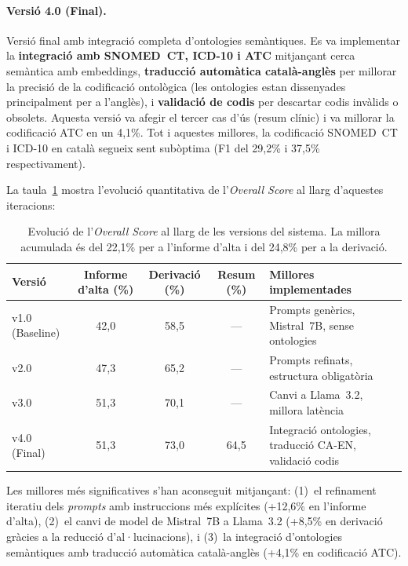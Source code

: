 \documentclass[CAT]{TFUOC}%
\begin{document}
\paragraph{Versió 4.0 (Final).}
Versió final amb integració completa d'ontologies semàntiques. Es va implementar la \textbf{integració amb SNOMED~CT, ICD-10 i ATC} mitjançant cerca semàntica amb embeddings, \textbf{traducció automàtica català-anglès} per millorar la precisió de la codificació ontològica (les ontologies estan dissenyades principalment per a l'anglès), i \textbf{validació de codis} per descartar codis invàlids o obsolets. Aquesta versió va afegir el tercer cas d'ús (resum clínic) i va millorar la codificació ATC en un 4,1\%. Tot i aquestes millores, la codificació SNOMED~CT i ICD-10 en català segueix sent subòptima (F1 del 29,2\% i 37,5\% respectivament).

La taula~\ref{tab:evolution} mostra l'evolució quantitativa de l'\textit{Overall Score} al llarg d'aquestes iteracions:

\begin{table}[H]
\centering
\small
\begin{tabular}{lcccp{5cm}}
\hline
\textbf{Versió} & \textbf{Informe d'alta (\%)} & \textbf{Derivació (\%)} & \textbf{Resum (\%)} & \textbf{Millores implementades} \\
\hline
v1.0 (Baseline) & 42,0 & 58,5 & --- & Prompts genèrics, Mistral~7B, sense ontologies \\
v2.0 & 47,3 & 65,2 & --- & Prompts refinats, estructura obligatòria \\
v3.0 & 51,3 & 70,1 & --- & Canvi a Llama~3.2, millora latència \\
v4.0 (Final) & 51,3 & 73,0 & 64,5 & Integració ontologies, traducció CA-EN, validació codis \\
\hline
\end{tabular}
\caption{Evolució de l'\textit{Overall Score} al llarg de les versions del sistema. La millora acumulada és del 22,1\% per a l'informe d'alta i del 24,8\% per a la derivació.}
\label{tab:evolution}
\end{table}

Les millores més significatives s'han aconseguit mitjançant: (1)~el refinament iteratiu dels \textit{prompts} amb instruccions més explícites (+12,6\% en l'informe d'alta), (2)~el canvi de model de Mistral~7B a Llama~3.2 (+8,5\% en derivació gràcies a la reducció d'al·lucinacions), i (3)~la integració d'ontologies semàntiques amb traducció automàtica català-anglès (+4,1\% en codificació ATC).
\end{document}
